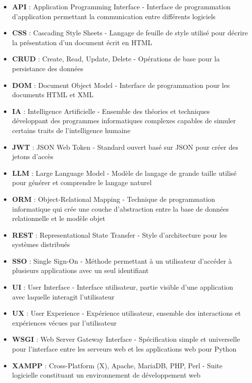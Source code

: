 \begin{itemize}
  \item \textbf{API} : Application Programming Interface - Interface de programmation d'application permettant la communication entre différents logiciels
  
  \item \textbf{CSS} : Cascading Style Sheets - Langage de feuille de style utilisé pour décrire la présentation d'un document écrit en HTML
  
  \item \textbf{CRUD} : Create, Read, Update, Delete - Opérations de base pour la persistance des données
  
  \item \textbf{DOM} : Document Object Model - Interface de programmation pour les documents HTML et XML
  
  \item \textbf{IA} : Intelligence Artificielle - Ensemble des théories et techniques développant des programmes informatiques complexes capables de simuler certains traits de l'intelligence humaine
  
  \item \textbf{JWT} : JSON Web Token - Standard ouvert basé sur JSON pour créer des jetons d'accès
  
  \item \textbf{LLM} : Large Language Model - Modèle de langage de grande taille utilisé pour générer et comprendre le langage naturel
  
  \item \textbf{ORM} : Object-Relational Mapping - Technique de programmation informatique qui crée une couche d'abstraction entre la base de données relationnelle et le modèle objet
  
  \item \textbf{REST} : Representational State Transfer - Style d'architecture pour les systèmes distribués
  
  \item \textbf{SSO} : Single Sign-On - Méthode permettant à un utilisateur d'accéder à plusieurs applications avec un seul identifiant
  
  \item \textbf{UI} : User Interface - Interface utilisateur, partie visible d'une application avec laquelle interagit l'utilisateur
  
  \item \textbf{UX} : User Experience - Expérience utilisateur, ensemble des interactions et expériences vécues par l'utilisateur
  
  \item \textbf{WSGI} : Web Server Gateway Interface - Spécification simple et universelle pour l'interface entre les serveurs web et les applications web pour Python
  
  \item \textbf{XAMPP} : Cross-Platform (X), Apache, MariaDB, PHP, Perl - Suite logicielle constituant un environnement de développement web
\end{itemize}
